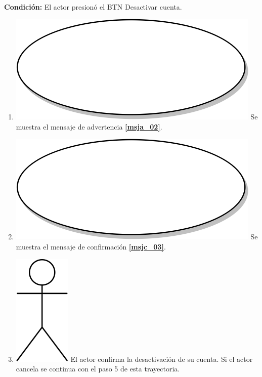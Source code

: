 \textbf{} \\
\textbf{Condición:} El actor presionó el BTN Desactivar cuenta. \\
 \begin{enumerate}[label=C\arabic*]
    \item {\includegraphics[scale=.05]{Capitulo3/img/proceso.png} Se muestra el mensaje de advertencia \textbf{\ref{msja_02}}.} \\
    \item {\includegraphics[scale=.05]{Capitulo3/img/proceso.png} Se muestra el mensaje de confirmación \textbf{\ref{msjc_03}}.} \\
    \item {\includegraphics[scale=.1]{Capitulo3/img/actor.png} El actor confirma la desactivación de su cuenta. Si el actor cancela se continua con el paso 5 de esta trayectoria.}

\end{enumerate}

